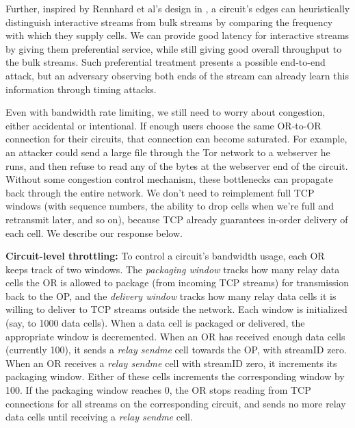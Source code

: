 \documentclass[times,10pt,twocolumn]{article}
\begin{document}
Further, inspired by Rennhard et al's design in \cite{anonnet}, a
circuit's edges can heuristically distinguish interactive streams from bulk
streams by comparing the frequency with which they supply cells.  We can
provide good latency for interactive streams by giving them preferential
service, while still giving good overall throughput to the bulk
streams. Such preferential treatment presents a possible end-to-end
attack, but an adversary observing both
ends of the stream can already learn this information through timing
attacks.

\label{subsec:congestion}

Even with bandwidth rate limiting, we still need to worry about
congestion, either accidental or intentional. If enough users choose the
same OR-to-OR connection for their circuits, that connection can become
saturated. For example, an attacker could send a large file
through the Tor network to a webserver he runs, and then
refuse to read any of the bytes at the webserver end of the
circuit. Without some congestion control mechanism, these bottlenecks
can propagate back through the entire network. We don't need to
reimplement full TCP windows (with sequence numbers,
the ability to drop cells when we're full and retransmit later, and so
on),
because TCP already guarantees in-order delivery of each
cell.
We describe our response below.

\textbf{Circuit-level throttling:}
To control a circuit's bandwidth usage, each OR keeps track of two
windows. The \emph{packaging window} tracks how many relay data cells the OR is
allowed to package (from incoming TCP streams) for transmission back to the OP,
and the \emph{delivery window} tracks how many relay data cells it is willing
to deliver to TCP streams outside the network. Each window is initialized
(say, to 1000 data cells). When a data cell is packaged or delivered,
the appropriate window is decremented. When an OR has received enough
data cells (currently 100), it sends a \emph{relay sendme} cell towards the OP,
with streamID zero. When an OR receives a \emph{relay sendme} cell with
streamID zero, it increments its packaging window. Either of these cells
increments the corresponding window by 100. If the packaging window
reaches 0, the OR stops reading from TCP connections for all streams
on the corresponding circuit, and sends no more relay data cells until
receiving a \emph{relay sendme} cell.
\end{document}
